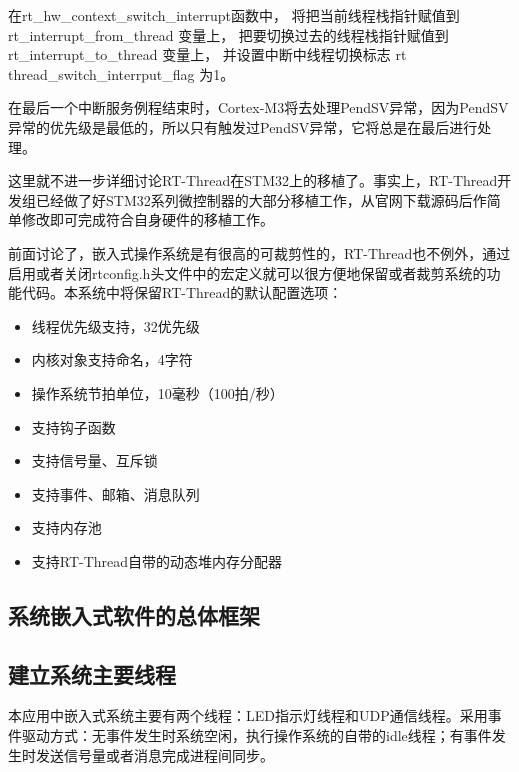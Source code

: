 在rt{\_}hw{\_}context{\_}switch{\_}interrupt函{\cf}数中{\cf}， {\cf}将把{\cf}当前{\cf}线程{\cf}栈指{\cf}针赋{\cf}值到 rt{\_}interrupt{\_}from{\_}thread 变{\cf}量上{\cf}， {\cf}把要{\cf}切换{\cf}过去{\cf}的线{\cf}程栈{\cf}指针{\cf}赋值{\cf}到 rt{\_}interrupt{\_}to{\_}thread 变{\cf}量上{\cf}， {\cf}并设{\cf}置中{\cf}断中{\cf}线程{\cf}切换{\cf}标志{\cf} rt thread{\_}switch{\_}interrput{\_}flag 为1。

在{\cf}最后{\cf}一个{\cf}中断{\cf}服务{\cf}例程{\cf}结束{\cf}时，Cortex{\reg}-M3将{\cf}去处{\cf}理P{\cf}en{\cf}dS{\cf}V异{\cf}常，{\cf}因为{\cf}Pe{\cf}nd{\cf}SV{\cf}异常{\cf}的优{\cf}先级{\cf}是最{\cf}低的{\cf}，所{\cf}以只{\cf}有触{\cf}发过{\cf}Pe{\cf}nd{\cf}SV{\cf}异常{\cf}，它{\cf}将总{\cf}是在{\cf}最后{\cf}进行{\cf}处理。

这里就不进一步详细讨论RT-Thread在STM32上的移植了。事实上，RT-Thread开发组已经做了好STM32系列微控制器的大部分移植工作，从官网下载源码后作简单修改即可完成符合自身硬件的移植工作。

前面讨论了，嵌入式操作系统是有很高的可裁剪性的，RT-Thread也不例外，通过启用或者关闭rtconfig.h头文件中的宏定义就可以很方便地保留或者裁剪系统的功能代码。本系统中将保留RT-Thread的默认配置选项：
\begin{itemize}
\item 线程优先级支持，32优先级
\item 内核对象支持命名，4字符
\item 操作系统节拍单位，10毫秒（100拍/秒）
\item 支持钩子函数
\item 支持信号量、互斥锁
\item 支持事件、邮箱、消息队列
\item 支持内存池
\item 支持RT-Thread自带的动态堆内存分配器
\end{itemize}

\subsection{系统嵌入式软件的总体框架}

\subsection{建立系统主要线程}
本应用中嵌入式系统主要有两个线程：LED指示灯线程和UDP通信线程。采用事件驱动方式：无事件发生时系统空闲，执行操作系统的自带的idle线程；有事件发生时发送信号量或者消息完成进程间同步。

